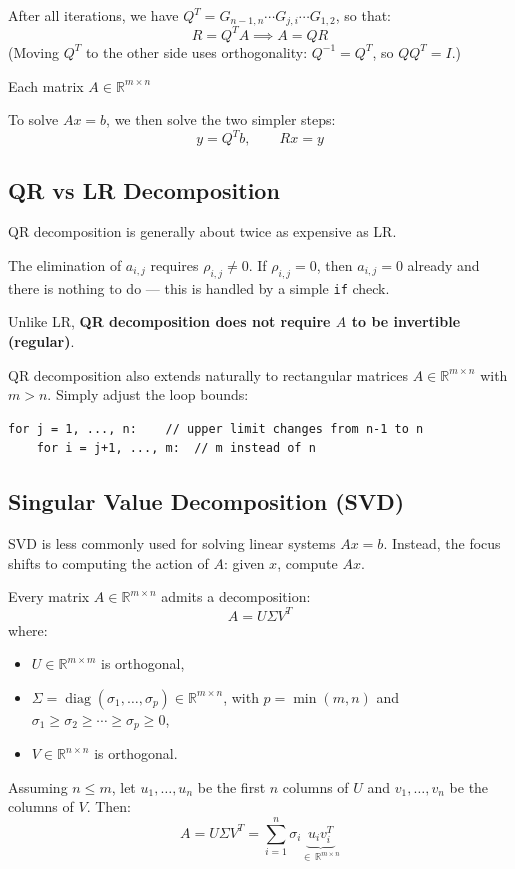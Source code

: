\documentclass{article}
\begin{document}
After all iterations, we have $Q^T = G_{n-1,n}\cdots G_{j,i} \cdots G_{1,2}$, so that:
\[
R = Q^T A \implies A = QR
\]
(Moving $Q^T$ to the other side uses orthogonality: $Q^{-1} = Q^T$, so $QQ^T = I$.)


Each matrix $A\in\mathbb{R}^{m\times n}$

To solve $Ax = b$, we then solve the two simpler steps:
\[
y = Q^T b, \qquad Rx = y
\]

\subsection{QR vs LR Decomposition}
QR decomposition is generally about twice as expensive as LR.

The elimination of $a_{i,j}$ requires $\rho_{i,j} \neq 0$. If $\rho_{i,j} = 0$, then $a_{i,j} = 0$ already and there is nothing to do — this is handled by a simple \texttt{if} check.

Unlike LR, \textbf{QR decomposition does not require $A$ to be invertible (regular)}.

QR decomposition also extends naturally to rectangular matrices $A \in \mathbb{R}^{m\times n}$ with $m > n$. Simply adjust the loop bounds:
\begin{lstlisting}
for j = 1, ..., n:    // upper limit changes from n-1 to n
    for i = j+1, ..., m:  // m instead of n
\end{lstlisting}

\subsection{Singular Value Decomposition (SVD)}
SVD is less commonly used for solving linear systems $Ax = b$. Instead, the focus shifts to computing the action of $A$: given $x$, compute $Ax$.

Every matrix $A \in \mathbb{R}^{m\times n}$ admits a decomposition:
\[A = U\Sigma V^T\]
where:
\begin{itemize}
  \item $U \in \mathbb{R}^{m\times m}$ is orthogonal,
  \item $\Sigma = \operatorname{diag}(\sigma_1, \dots, \sigma_p) \in \mathbb{R}^{m\times n}$, with $p = \min(m,n)$ and $\sigma_1 \geq \sigma_2 \geq \cdots \geq \sigma_p \geq 0$,
  \item $V \in \mathbb{R}^{n\times n}$ is orthogonal.
\end{itemize}

Assuming $n \leq m$, let $u_1, \dots, u_n$ be the first $n$ columns of $U$ and $v_1, \dots, v_n$ be the columns of $V$. Then:
\[
A = U\Sigma V^T = \sum_{i=1}^{n} \sigma_i \underbrace{u_i v_i^T}_{\in\,\mathbb{R}^{m\times n}}
\]
\end{document}
